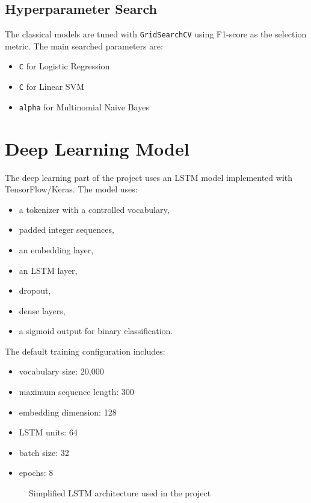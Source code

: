 \documentclass[12pt,a4paper]{article}
\begin{document}
\subsection{Hyperparameter Search}
The classical models are tuned with \texttt{GridSearchCV} using F1-score as the selection metric. The main searched parameters are:
\begin{itemize}[leftmargin=*]
\item \texttt{C} for Logistic Regression
\item \texttt{C} for Linear SVM
\item \texttt{alpha} for Multinomial Naive Bayes
\end{itemize}

\section{Deep Learning Model}
The deep learning part of the project uses an LSTM model implemented with TensorFlow/Keras. The model uses:
\begin{itemize}[leftmargin=*]
\item a tokenizer with a controlled vocabulary,
\item padded integer sequences,
\item an embedding layer,
\item an LSTM layer,
\item dropout,
\item dense layers,
\item a sigmoid output for binary classification.
\end{itemize}

The default training configuration includes:
\begin{itemize}[leftmargin=*]
\item vocabulary size: 20,000
\item maximum sequence length: 300
\item embedding dimension: 128
\item LSTM units: 64
\item batch size: 32
\item epochs: 8
\end{itemize}

\begin{figure}[H]
\centering
{}
\caption{Simplified LSTM architecture used in the project}
\label{fig:lstm-arch}
\end{figure}
\end{document}
